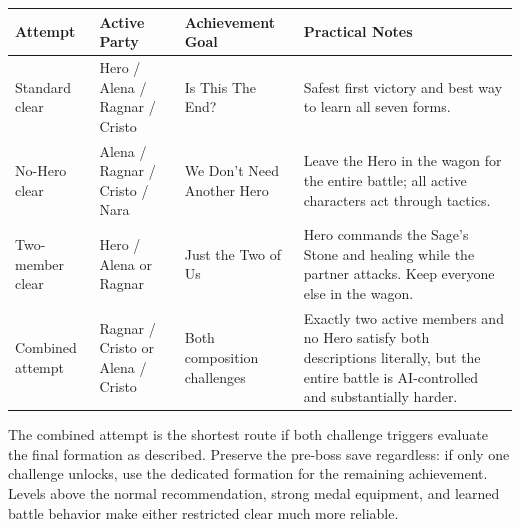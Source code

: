 \documentclass[
  american,
  10pt,
  letterpaper,
  oneside,
  open=any]{scrreprt}
\newcounter{none} %
\newenvironment{guidetable}{%
  \small\setstretch{1.0}%
  \setlength{\tabcolsep}{4pt}%
  \setlength{\LTpre}{8pt}\setlength{\LTpost}{10pt}%
  \renewcommand{\arraystretch}{1.16}%
}{ }
\begin{document}
\begin{guidetable}

{\def\LTcaptype{none} %
\begin{longtable}[]{@{}
  >{\raggedright\arraybackslash}p{}
  >{\raggedright\arraybackslash}p{}
  >{\raggedright\arraybackslash}p{}
  >{\raggedright\arraybackslash}p{}@{}}
\toprule\noalign{}
\begin{minipage}[b]{\linewidth}\raggedright
\color{GuideGreen}\bfseries Attempt
\end{minipage} & \begin{minipage}[b]{\linewidth}\raggedright
\color{GuideGreen}\bfseries Active Party
\end{minipage} & \begin{minipage}[b]{\linewidth}\raggedright
\color{GuideGreen}\bfseries Achievement Goal
\end{minipage} & \begin{minipage}[b]{\linewidth}\raggedright
\color{GuideGreen}\bfseries Practical Notes
\end{minipage} \\
\midrule\noalign{}
\endhead
\bottomrule\noalign{}
\endlastfoot
Standard clear & Hero / Alena / Ragnar / Cristo & Is This The End? &
Safest first victory and best way to learn all seven forms. \\
No-Hero clear & Alena / Ragnar / Cristo / Nara & We Don't Need Another
Hero & Leave the Hero in the wagon for the entire battle; all active
characters act through tactics. \\
Two-member clear & Hero / Alena or Ragnar & Just the Two of Us & Hero
commands the Sage's Stone and healing while the partner attacks. Keep
everyone else in the wagon. \\
Combined attempt & Ragnar / Cristo or Alena / Cristo & Both composition
challenges & Exactly two active members and no Hero satisfy both
descriptions literally, but the entire battle is AI-controlled and
substantially harder. \\
\end{longtable}
}

\end{guidetable}

The combined attempt is the shortest route if both challenge triggers
evaluate the final formation as described. Preserve the pre-boss save
regardless: if only one challenge unlocks, use the dedicated formation
for the remaining achievement. Levels above the normal recommendation,
strong medal equipment, and learned battle behavior make either
restricted clear much more reliable.
\end{document}

